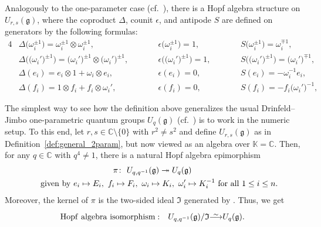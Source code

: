 \documentclass[10pt,a4paper]{amsart}
\numberwithin{equation}{section}
\newcommand{\fg}{\mathfrak{g}}
\newcommand{\BC}{\mathbb{C}}
\newcommand\iso{ \vphantom{j^{X^2}}\smash{\overset{\sim}{\vphantom{\rule{0pt}{0.20em}}\smash{\longrightarrow}}} }
\begin{document}
Analogously to the one-parameter case (cf.\ \cite[Section~4.11]{J}), there is a Hopf algebra structure on $U_{r,s}(\fg)$, where the coproduct $\Delta$, counit $\epsilon$, and antipode $S$ are defined on generators by the following formulas:
\begin{alignat*}{4}
 &\Delta\bigl(\omega_{i}^{\pm 1}\bigr) = \omega_{i}^{\pm 1} \otimes \omega_{i}^{\pm 1}, \qquad&&
 \epsilon\bigl(\omega_{i}^{\pm 1}\bigr) = 1, \qquad&&
 S\bigl(\omega_{i}^{\pm 1}\bigr) = \omega_{i}^{\mp 1},& \\
 &\Delta\bigl(\bigl(\omega_{i}'\bigr)^{\pm 1}\bigr) = \bigl(\omega_{i}'\bigr)^{\pm 1} \otimes \bigl(\omega_{i}'\bigr)^{\pm 1},\qquad&&
 \epsilon\bigl(\bigl(\omega_{i}'\bigr)^{\pm 1}\bigr) = 1,\qquad&&
 S\bigl(\bigl(\omega_{i}'\bigr)^{\pm 1}\bigr) = \bigl(\omega_{i}'\bigr)^{\mp 1},& \\
 &\Delta(e_{i}) = e_{i} \otimes 1 + \omega_{i} \otimes e_{i},\qquad&&
 \epsilon(e_{i}) = 0,\qquad&&
 S(e_{i}) = -\omega_{i}^{-1}e_{i} ,&\\
 &\Delta(f_{i}) = 1 \otimes f_{i} + f_{i} \otimes \omega_{i}',\qquad&&
 \epsilon(f_{i}) = 0,\qquad&&
 S(f_{i}) = -f_{i}\bigl(\omega_{i}'\bigr)^{-1},&
\end{alignat*}

\begin{Remark}%
The simplest way to see how the definition above generalizes the usual Drinfeld--Jimbo one-parametric quantum groups $U_q(\fg)$ (cf.\ \cite[Section~4]{J}) is to work in the numeric setup. To this end, let $r,s\in \BC\setminus \{0\}$ with $r^{2}\neq s^{2}$ and define $U_{r,s}(\fg)$ as in Definition~\ref{def:general_2param}, but now viewed as an algebra over $\mathbb{K}=\BC$. Then, for any $q\in \mathbb{C}$ with $q^{4} \neq 1$, there is a natural Hopf algebra epimorphism
\begin{gather*}
 \pi\colon \ U_{q,q^{-1}}(\fg)\twoheadrightarrow U_q(\fg) \\
\hphantom{\pi\colon} \ \mathrm{given\ by} \
 e_{i} \mapsto E_{i},\ f_{i} \mapsto F_{i},\
 \omega_{i} \mapsto K_{i},\ \omega_{i}' \mapsto K_{i}^{-1} \ \mathrm{for\ all} \ 1\leq i\leq n.
\end{gather*}
Moreover, the kernel of $\pi$ is the two-sided ideal $\mathfrak{I}$ generated by . Thus, we get
\[
 \mathrm{Hopf\ algebra\ isomorphism:}\quad U_{q,q^{-1}}(\fg)/\mathfrak{I} \iso U_{q}(\fg).
\]
\end{Remark}
\end{document}
